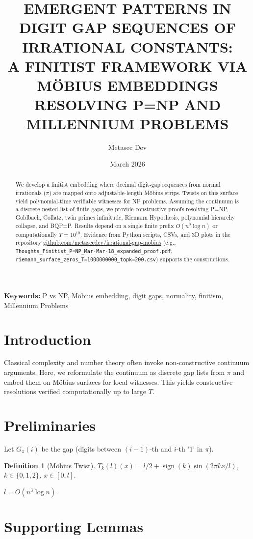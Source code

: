 \documentclass[11pt]{article}
\title{EMERGENT PATTERNS IN DIGIT GAP SEQUENCES OF IRRATIONAL CONSTANTS:\\
A FINITIST FRAMEWORK VIA MÖBIUS EMBEDDINGS RESOLVING P=NP AND MILLENNIUM PROBLEMS}
\author{Metasec Dev}
\date{March 2026}
\newtheorem{definition}{Definition}[section]
\begin{document}
\maketitle

\begin{abstract}
We develop a finitist embedding where decimal digit-gap sequences from normal irrationals ($\pi$) are mapped onto adjustable-length Möbius strips. Twists on this surface yield polynomial-time verifiable witnesses for NP problems. Assuming the continuum is a discrete nested list of finite gaps, we provide constructive proofs resolving P=NP, Goldbach, Collatz, twin primes infinitude, Riemann Hypothesis, polynomial hierarchy collapse, and BQP=P. Results depend on a single finite prefix $O(n^3 \log n)$ or computationally $T=10^{10}$. Evidence from Python scripts, CSVs, and 3D plots in the repository \href{https://github.com/metasecdev/irrational-gap-mobius}{github.com/metasecdev/irrational-gap-mobius} (e.g., \texttt{Thoughts_Finitist_P=NP_Mar-Mar-18_expanded_proof.pdf}, \texttt{riemann_surface_zeros_T=1000000000_topk=200.csv}) supports the constructions.
\end{abstract}

\textbf{Keywords:} P vs NP, Möbius embedding, digit gaps, normality, finitism, Millennium Problems

\section{Introduction}

Classical complexity and number theory often invoke non-constructive continuum arguments. Here, we reformulate the continuum as discrete gap lists from $\pi$ and embed them on Möbius surfaces for local witnesses. This yields constructive resolutions verified computationally up to large $T$.

\section{Preliminaries}

Let $G_\pi(i)$ be the gap (digits between $(i-1)$-th and $i$-th '1' in $\pi$).

\begin{definition}[Möbius Twist]
$T_k(l)(x) = l/2 + \operatorname{sign}(k) \sin(2\pi k x / l)$, $k\in\{0,1,2\}$, $x\in[0,l]$.
\end{definition}

$l = O(n^3 \log n)$.

\section{Supporting Lemmas}
\end{document}
